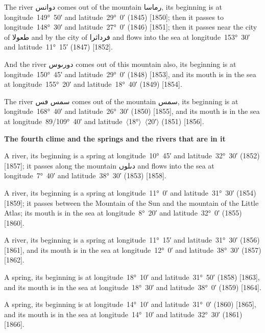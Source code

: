 \documentclass[11pt]{article}
\newcommand{\Pg}[1]{\marginpar{\footnotesize #1}}
\newcommand{\Ang}[1]{\ensuremath{#1}}
\begin{document}
The river \textarabic{دوانس} comes out of the mountain \textarabic{رماسا}, its beginning is at longitude~149°~50′ and latitude~29°~0′ (1845) [1850]; then it passes to longitude~148°~30′ and latitude~27°~0′ (1846) [1851]; then it passes near the city of \textarabic{طعولا} and by the city of \textarabic{فرداثرا} and flows into the sea at longitude~153°~30′ and latitude~11°~15′ (1847) [1852].

And the river \textarabic{دورٮوس} comes out of this mountain also, its beginning is at longitude~150°~45′ and latitude~29°~0′ (1848) [1853], and its mouth is in the sea at longitude~155°~20′ and latitude~18°~40′ (1849) [1854].

The river \textarabic{سمس ڡس} comes out of the mountain \textarabic{سمس}, its beginning is at longitude~168°~40′ and latitude~26°~30′ (1850) [1855], and its mouth is in the sea at longitude~89/109°~40′ and latitude~\Ang{\langle}18°\Ang{\rangle}~\Ang{\langle}20′\Ang{\rangle} (1851) [1856].

\par\medskip\begin{center}\bfseries The fourth clime and the springs and the rivers that are in it\end{center}\par

A river, its beginning is a spring at longitude~10°~45′ and latitude~32°~30′ (1852) [1857]; it passes along the mountain \textarabic{دٮلوں} and flows into the sea at longitude~7°~40′ and latitude~38°~30′ (1853) [1858]\Pg{p. 123}.

A river, its beginning is a spring at longitude~11°~0′ and latitude~31°~30′ (1854) [1859]; it passes between the Mountain of the Sun and the mountain of the Little Atlas; its mouth is in the sea at longitude~8°~20′ and latitude~32°~0′ (1855) [1860].

A river, its beginning is a spring at longitude~11°~15′ and latitude~31°~30′ (1856) [1861], and its mouth is in the sea at longitude~12°~0′ and latitude~38°~30′ (1857) [1862].

A spring, its beginning is at longitude~18°~10′ and latitude~31°~50′ (1858) [1863], and its mouth is in the sea at longitude~18°~30′ and latitude~38°~0′ (1859) [1864].

A spring, its beginning is at longitude~14°~10′ and latitude~31°~0′ (1860) [1865], and its mouth is in the sea at longitude~14°~10′ and latitude~32°~30′ (1861) [1866].
\end{document}
